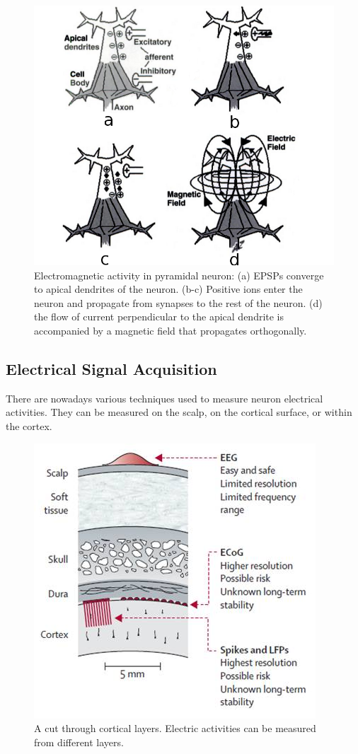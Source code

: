 \begin{figure}[!h]
\centering
\includegraphics[width=0.5\columnwidth]{Figures/neuron-electromagnetic}
\caption{Electromagnetic activity in pyramidal neuron: (a) EPSPs converge to apical dendrites of the neuron. (b-c) Positive ions enter the neuron and propagate from synapses to the rest of the neuron. (d) the flow of current perpendicular to the apical dendrite is accompanied by a magnetic field that propagates orthogonally. \citep{proverbio_electromagnetic_2003}}
\end{figure}

\subsection{Electrical Signal Acquisition}
\label{elec_acquisition}

There are nowadays various techniques used to measure neuron electrical activities.
They can be measured on the scalp, on the cortical surface, or within the cortex.
\begin{figure}[!h]
\centering
\includegraphics[width=0.5\columnwidth]{Figures/cranial-layers}
\caption{A cut through cortical layers. Electric activities can be measured from different layers. \citep[Reproduced from][]{daly_brain-computer_2008}}
\end{figure} 

